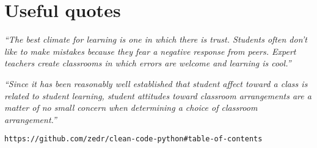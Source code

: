 \documentclass[10pt]{article}
\begin{document}
\section{Useful quotes}
 
\begin{center} 
\emph{``The best climate for learning is one in which there is trust. Students often don’t like to make mistakes because they fear a negative response from peers. Expert teachers create classrooms in which errors are welcome and learning is cool.''} \cite{Hat12}
\end{center}
 
\begin{center} 
\emph{``Since it has been reasonably well established that student affect toward a class is related to student learning, student attitudes toward classroom arrangements are a matter of no small concern when determining a choice of classroom arrangement.''} \cite{MM78}
\end{center}

\begin{verbatim}
https://github.com/zedr/clean-code-python#table-of-contents
\end{verbatim}
\end{document}
